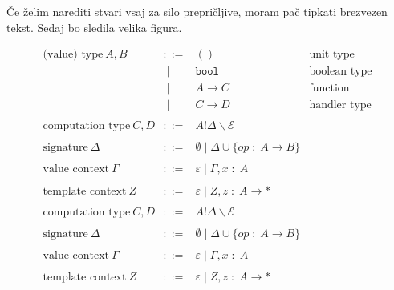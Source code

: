 \documentclass{article}
\newcommand{\ctx}{\Gamma}
\newcommand{\oftype}{\;:\;}
\newcommand{\tyA}{A}
\newcommand{\tyB}{B}
\newcommand{\ctyC}{C}
\newcommand{\ctyD}{D}
\begin{document}
Če želim narediti stvari vsaj za silo prepričljive, moram pač tipkati brezvezen tekst. Sedaj bo sledila velika figura.

\begin{figure}[h]
  \label{fig:velika-figura}
  \[
	\begin{array}{rrll}
		\text{(value) type}~\tyA, \tyB
		 & ::=   & \mathtt{()}          & \text{unit type}\\
		 & \;|\; & \mathtt{bool}        & \text{boolean type}\\
		 & \;|\; & \tyA \to \ctyC     & \text{function type}\\
		 & \;|\; & \ctyC \to \ctyD   & \text{handler type}\\
		\\
		\text{computation type}~\ctyC, \ctyD
		 & ::=   & {\tyA ! \Delta \backslash \mathcal{E}}\\
		\\
		\text{signature}~\Delta
		 & ::=   & \emptyset \;|\; \Delta \cup \{{\mathit{op} \oftype \tyA \to \tyB}\}\\
		\\
		\text{value context}~\ctx
		 & ::=   & \varepsilon \;|\; \ctx, x \oftype \tyA \\
		\\
		\text{template context}~Z
     & ::=   & \varepsilon \;|\; Z, z \oftype \tyA \to * \\
     \\
		\text{computation type}~\ctyC, \ctyD
		 & ::=   & {\tyA ! \Delta \backslash \mathcal{E}}\\
		\\
		\text{signature}~\Delta
		 & ::=   & \emptyset \;|\; \Delta \cup \{{\mathit{op} \oftype \tyA \to \tyB}\}\\
		\\
		\text{value context}~\ctx
		 & ::=   & \varepsilon \;|\; \ctx, x \oftype \tyA \\
		\\
		\text{template context}~Z
		 & ::=   & \varepsilon \;|\; Z, z \oftype \tyA \to * \\
	\end{array}
\]

\end{figure}

\renewcommand\refname{Literatura}


\end{document}
